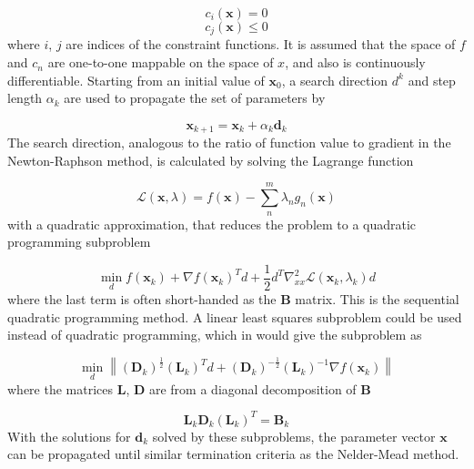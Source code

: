 \begin{equation}
c_i \left(\mathbf{x} \right) = 0
\end{equation}
\begin{equation}
c_j \left(\mathbf{x} \right) \leq 0
\end{equation}
%
where $i$, $j$ are indices of the constraint functions.
It is assumed that the space of $f$ and $c_n$ are one-to-one mappable on the
space of $x$, and also is continuously differentiable. Starting from an initial
value of $\mathbf{x}_0$, a search direction $d^k$ and step length $\alpha_k$ are
used to propagate the set of parameters by

\begin{equation}
\mathbf{x}_{k+1} = \mathbf{x}_k + \alpha_k \mathbf{d}_k
\end{equation}
%
The search direction, analogous to the ratio of function value to gradient in the
Newton-Raphson method, is calculated by solving the Lagrange function

\begin{equation}
\mathcal{L} \left(\mathbf{x}, \lambda\right) = f\left(\mathbf{x}\right) - \sum^m_n \lambda_n g_n \left( \mathbf{x}\right)
\end{equation}
%
with a quadratic approximation, that reduces the problem to a quadratic programming
subproblem

\begin{equation}
\min_d f\left(\mathbf{x}_k\right) + \nabla f\left(\mathbf{x}_k\right)^T d + \frac{1}{2}d^T \nabla^2_{xx} \mathcal{L} \left(\mathbf{x}_k, \lambda_k \right) d
\end{equation}
%
where the last term is often short-handed as the $\mathbf{B}$ matrix. This is the 
sequential quadratic programming method. A linear least squares subproblem could
be used instead of quadratic programming, which in would give the subproblem as

\begin{equation}
\min_d \left\| \left(\mathbf{D}_k\right)^{\frac{1}{2}} \left(\mathbf{L}_k\right)^T d + \left(\mathbf{D}_k\right)^{-\frac{1}{2}}\left(\mathbf{L}_k\right)^{-1}\nabla f \left(\mathbf{x}_k\right)\right\|
\end{equation}
%
where the matrices $\mathbf{L}$, $\mathbf{D}$ are from a diagonal decomposition 
of $\mathbf{B}$

\begin{equation}
\mathbf{L}_k \mathbf{D}_k \left(\mathbf{L}_k\right)^T = \mathbf{B}_k
\end{equation}
%
With the solutions for $\mathbf{d}_k$ solved by these subproblems, the parameter 
vector $\mathbf{x}$ can be propagated until similar termination criteria as the 
Nelder-Mead method.

